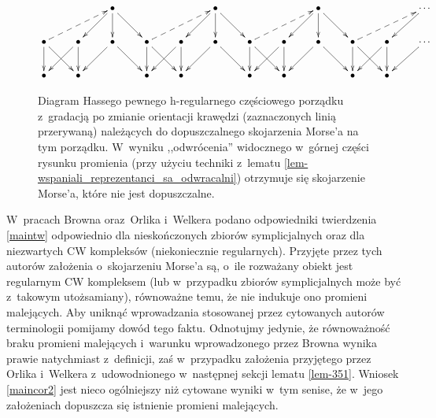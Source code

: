 \begin{figure}[h]
\[
\xymatrix{
& & \bullet\ar@{<--}[dll]\ar[dl]\ar[d]\ar[dr] & & & \bullet\ar@{<--}[dll]\ar[dl]\ar[d]\ar[dr] & & & \bullet\ar@{<--}[dll]\ar[dl]\ar[d]\ar[dr] & & & \cdots\ar@{<--}[dll]\ar[dl]\\
\bullet\ar[d]\ar[dr] & \bullet\ar[d]\ar[dl] & \bullet\ar[dr]\ar[dl] & \bullet\ar[d]\ar[dr] & \bullet\ar[d]\ar[dl] & \bullet\ar[dr]\ar[dl] & \bullet\ar[d]\ar[dr] & \bullet\ar[d]\ar[dl] & \bullet\ar[dr]\ar[dl] & \bullet\ar[d]\ar[dr] & \bullet\ar[d]\ar[dl] & \cdots\ar[dl]\\
\bullet & \bullet & & \bullet & \bullet & & \bullet & \bullet & & \bullet & \bullet
}
\]
\caption{Diagram Hassego pewnego h-regularnego częściowego porządku z~gradacją po zmianie orientacji krawędzi (zaznaczonych linią przerywaną) należących do dopuszczalnego skojarzenia Morse'a na tym porządku. W~wyniku ,,odwrócenia'' widocznego w~górnej części rysunku promienia (przy użyciu techniki z~lematu \ref{lem-wspaniali_reprezentanci_sa_odwracalni}) otrzymuje się skojarzenie Morse'a, które nie jest dopuszczalne.}\label{fig-bad_matching}
\end{figure}

\begin{uw}
W~pracach Browna \cite[Proposition 1]{Brown92} oraz~Orlika i~Welkera \cite[Theorem 4.2.14]{Orlik07} podano odpowiedniki twierdzenia \ref{maintw} odpowiednio dla nieskończonych zbiorów symplicjalnych oraz dla niezwartych CW kompleksów (niekoniecznie regularnych). Przyjęte przez tych autorów założenia o~skojarzeniu Morse'a są, o~ile rozważany obiekt jest regularnym CW kompleksem (lub w~przypadku zbiorów symplicjalnych może być z~takowym utożsamiany), równoważne temu, że nie indukuje ono promieni malejących. Aby uniknąć wprowadzania stosowanej przez cytowanych autorów terminologii pomijamy dowód tego faktu. Odnotujmy jedynie, że równoważność braku promieni malejących i~warunku wprowadzonego przez Browna \cite[Condition (C2)]{Brown92} wynika prawie natychmiast z~definicji, zaś w~przypadku założenia przyjętego przez Orlika i~Welkera \cite[Definition 4.2.10]{Orlik07} z~udowodnionego w~następnej sekcji lematu \ref{lem-351}. Wniosek \ref{maincor2} jest nieco ogólniejszy niż cytowane wyniki w~tym senise, że w~jego założeniach dopuszcza się istnienie promieni malejących.
\end{uw}





